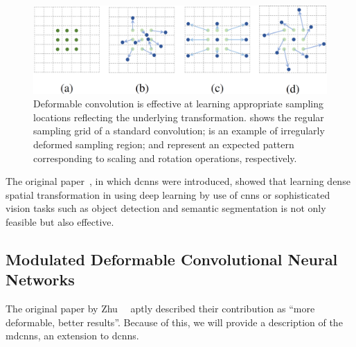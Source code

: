 \begin{figure}[t]
    \centerline{\includegraphics[width=0.7\linewidth]{figures/siamese_tracking/dcn_sampling_locations.png}}
    \caption[Various sampling locations in \glspl{dcnn}]{Deformable convolution is effective at learning appropriate sampling locations reflecting the underlying transformation.  shows the regular sampling grid of a standard convolution;  is an example of irregularly deformed sampling region;  and  represent an expected pattern corresponding to scaling and rotation operations, respectively. }
    \label{fig:SamplingLocationsDeformableCNN}
\end{figure}

The original paper~\cite{dai2017dcnn}, in which \glspl{dcnn} were introduced, showed that learning dense spatial transformation in using deep learning by use of \glspl{cnn} or sophisticated vision tasks such as object detection and semantic segmentation is not only feasible but also effective.

\subsection{Modulated Deformable Convolutional Neural Networks}
\label{ssec:ModulatedDeformableCNNs}

The original paper by Zhu~\etal{}~\cite{zhu2018mdcnn} aptly described their contribution as ``more deformable, better results''. Because of this, we will provide a description of the \glspl{mdcnn}, an extension to \glspl{dcnn}.

